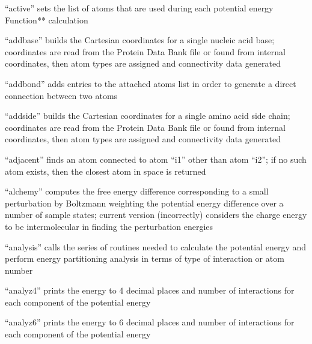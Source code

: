 \documentclass[letterpaper,11pt,english]{sphinxmanual}
\begin{document}

“active” sets the list of atoms that are used during each potential energy Function** calculation


“addbase” builds the Cartesian coordinates for a single nucleic acid base; coordinates are read from the Protein Data Bank file or found from internal coordinates, then atom types are assigned and connectivity data generated


“addbond” adds entries to the attached atoms list in order to generate a direct connection between two atoms


“addside” builds the Cartesian coordinates for a single amino acid side chain; coordinates are read from the Protein Data Bank file or found from internal coordinates, then atom types are assigned and connectivity data generated


“adjacent” finds an atom connected to atom “i1” other than atom “i2”; if no such atom exists, then the closest atom in space is returned


“alchemy” computes the free energy difference corresponding to a small perturbation by Boltzmann weighting the potential energy difference over a number of sample states; current version (incorrectly) considers the charge energy to be intermolecular in finding the perturbation energies


“analysis” calls the series of routines needed to calculate the potential energy and perform energy partitioning analysis in terms of type of interaction or atom number


“analyz4” prints the energy to 4 decimal places and number of interactions for each component of the potential energy


“analyz6” prints the energy to 6 decimal places and number of interactions for each component of the potential energy

\end{document}
